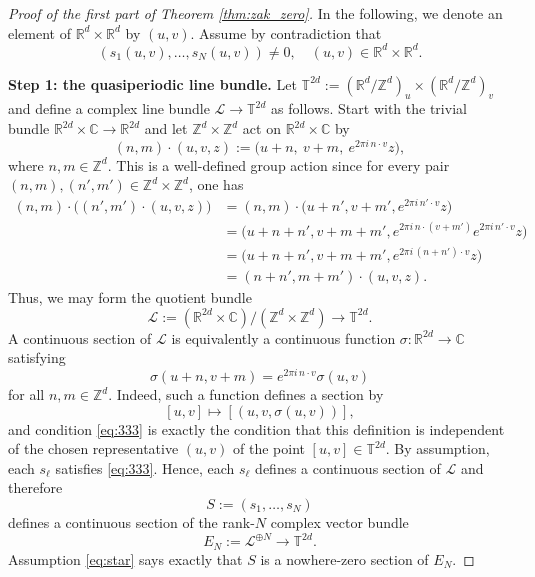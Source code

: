 \documentclass[reqno,a4paper,12pt]{amsart}
\numberwithin{equation}{section}
\def\R{{\mathbb R}}
\newcommand{\Rd}{{\R^d}}
\newcommand\1{\mathds{1}}
\begin{document}
\begin{proof}[Proof of the first part of Theorem \ref{thm:zak_zero}]    

In the following, we denote an element of $\Rd \times \Rd$ by $(u,v)$. Assume by contradiction that
\begin{equation}\label{eq:star}
    (s_1(u,v),\dots,s_N(u,v))\neq 0, \quad (u,v)\in\mathbb R^d\times\mathbb R^d.
\end{equation}

\smallskip
\noindent\textbf{Step 1: the quasiperiodic line bundle.}
Let
$
\mathbb T^{2d}
:=
(\mathbb R^d/\mathbb Z^d)_u\times(\mathbb R^d/\mathbb Z^d)_v
$
and define a complex line bundle
$
\mathcal L \to \mathbb T^{2d}
$
as follows. Start with the trivial bundle
$
\mathbb R^{2d}\times \mathbb C\to \mathbb R^{2d}
$
and let $\mathbb Z^d\times\mathbb Z^d$ act on $\mathbb R^{2d}\times \mathbb C$ by
$$
(n,m)\cdot (u,v,z)
:=
\bigl(u+n,\ v+m,\ e^{2\pi i\,n\cdot v}z\bigr),
$$
where $n,m\in\mathbb Z^d$.
This is a well-defined group action since for every pair $(n,m),(n',m')\in
\mathbb Z^d\times\mathbb Z^d$, one has
$$
\begin{aligned}
(n,m)\cdot\bigl((n',m')\cdot(u,v,z)\bigr)
&=
(n,m)\cdot
\bigl(u+n',v+m',e^{2\pi i\,n'\cdot v}z\bigr)  \\
&=
\bigl(u+n+n',v+m+m',
e^{2\pi i\,n\cdot(v+m')}e^{2\pi i\,n'\cdot v}z\bigr)  \\
&=
\bigl(u+n+n',v+m+m',
e^{2\pi i\,(n+n')\cdot v}z\bigr) \\
&=
(n+n',m+m')\cdot(u,v,z).
\end{aligned}
$$
Thus, we may form the quotient bundle
$$
\mathcal L
:=
(\mathbb R^{2d}\times\mathbb C)/(\mathbb Z^d\times\mathbb Z^d)
\to
\mathbb T^{2d}.
$$
A continuous section of $\mathcal L$ is equivalently a continuous function
$
\sigma:\mathbb R^{2d}\to\mathbb C
$
satisfying
\begin{equation}\label{eq:333}
    \sigma(u+n,v+m)
=
e^{2\pi i\,n\cdot v}\sigma(u,v)
\end{equation}
for all $n,m\in\mathbb Z^d$.
Indeed, such a function defines a section by
$$
[u,v]\longmapsto [(u,v,\sigma(u,v))],
$$
and condition \eqref{eq:333} is exactly the condition that this definition is independent of
the chosen representative $(u,v)$ of the point $[u,v]\in\mathbb T^{2d}$.
By assumption, each $s_\ell$ satisfies \eqref{eq:333}. Hence, each $s_\ell$ defines a continuous
section of $\mathcal L$ and therefore
$$
S:=(s_1,\dots,s_N)
$$
defines a continuous section of the rank-$N$ complex vector bundle
$$
E_N:=\mathcal L^{\oplus N} \to \mathbb T^{2d}.
$$
Assumption \eqref{eq:star} says exactly that $S$ is a nowhere-zero section of
$E_N$.


\end{proof}
\end{document}
